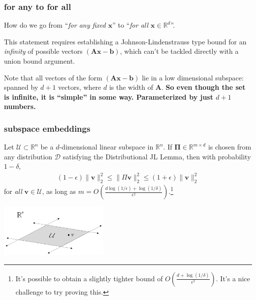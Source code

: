 \documentclass[compress]{beamer}
\newcommand{\bs}[1]{\boldsymbol{#1}}
\newcommand{\bv}[1]{\mathbf{#1}}
\newcommand{\R}{\mathbb{R}}
\begin{document}
\begin{frame}[t]
	\frametitle{for any to for all}
	\begin{center}
	How do we go from ``\emph{for any fixed $\bv{x}$}'' to ``\emph{for all $\bv{x} \in \R^d$}''.
	\end{center}
	
	This statement requires establishing a Johnson-Lindenstrauss type bound for an \emph{infinity} of possible vectors $(\bv{A}\bv{x} - \bv{b})$, which can't be tackled directly with a union bound argument. 
	\vspace{4em}
	
	Note that all vectors of the form  $(\bv{A}\bv{x} - \bv{b})$ lie in a low dimensional subspace: spanned by $d+1$ vectors, where $d$ is the width of $\bv{A}$. \alert{\textbf{So even though the set is infinite, it is ``simple'' in some way. Parameterized by just $d + 1$ numbers.}}
\end{frame}


\begin{frame}
	\frametitle{subspace embeddings}
	\begin{theorem}
		Let $\mathcal{U} \subset \R^n$ be a $d$-dimensional linear subspace in $\R^n$. If $\bs{\Pi}\in \R^{m\times d}$ is chosen from any distribution $\mathcal{D}$ satisfying the Distributional  JL Lemma, then with probability $1-\delta$,
		\begin{align*}
			(1-\epsilon)\|\bv{v}\|_2^2 \leq \|\Pi \bv{v}\|_2^2 \leq	(1+\epsilon)\|\bv{v}\|_2^2
		\end{align*}
		for \emph{all} $\bv{v} \in \mathcal{U}$, as long as  $m = O\left(\frac{d\log(1/\epsilon) + \log(1/\delta)}{\epsilon^2}\right)$.\footnote{It's possible to obtain a slightly tighter bound of $O\left(\frac{d+\log(1/\delta)}{\epsilon^2}\right)$. It's a nice challenge to try proving this.}
	\end{theorem}
	\begin{center}
		\includegraphics[width=0.4\textwidth]{subspace_vis.png}
	\end{center}
\end{frame}
\end{document}
